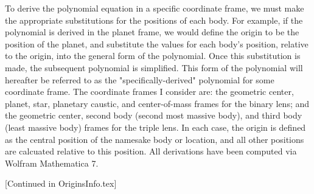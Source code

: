 \documentclass{article}
\begin{document}
To derive the polynomial equation in a specific coordinate frame, we
must make the appropriate substitutions for the positions of each body.
For example, if the polynomial is derived in the planet frame, we
would define the origin to be the position of the planet, and substitute the
values for each body's position, relative to the origin, into the general form
of the polynomial. Once this substitution is made, the subsequent polynomial is
simplified. This form of the polynomial will hereafter be referred to as the
"specifically-derived" polynomial for some coordinate frame. The coordinate
frames I consider are: the geometric center, planet, star, planetary caustic,
and center-of-mass frames for the binary lens; and the geometric center,
second body (second most massive body), and third body (least massive body) frames
for the triple lens. In each case, the origin is defined as the central position
of the namesake body or location, and all other positions are calcuated relative
to this position. All derivations have been computed via Wolfram Mathematica 7.

[Continued in OriginsInfo.tex]
\end{document}
